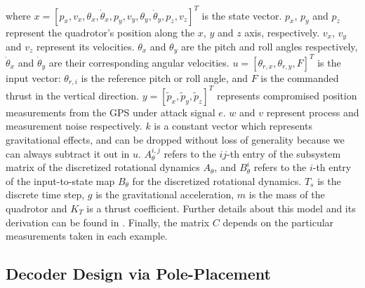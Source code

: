 \documentclass[journal]{IEEEtran}
\begin{document}
\noindent 
where $x = [p_x, v_x, \theta_x, \dot \theta_x, p_y, v_y, \theta_y, \dot\theta_y, p_z, v_z]^T$ is the state vector. $p_x$, $p_y$ and $p_z$ represent the quadrotor's position along the $x$, $y$ and $z$ axis, respectively. $v_x$, $v_y$ and $v_z$ represent its velocities. $\theta_x$ and $\theta_y$ are the pitch and roll angles respectively, $\dot \theta_x$ and $\dot \theta_y$ are their corresponding angular velocities. $u = [\theta_{r,x}, \theta_{r,y}, F]^T$ is the input vector: $\theta_{r,i}$ is the reference pitch or roll angle, and $F$ is the commanded thrust in the vertical direction. $y = [\tilde{p}_x, \tilde{p}_y, \tilde{p}_z]^T$ represents compromised position measurements from the GPS under attack signal $e$. $w$ and $v$ represent process and measurement noise respectively. $k$ is a constant vector which represents gravitational effects, and can be dropped without loss of generality because we can always subtract it out in $u$. $A_\theta^{i,j}$ refers to the $ij$-th entry of the subsystem matrix of the discretized rotational dynamics $A_\theta$, and $B_\theta^i$ refers to the $i$-th entry of the input-to-state map $B_\theta$ for the discretized rotational dynamics. $T_s$ is the discrete time step, $g$ is the gravitational acceleration, $m$ is the mass of the quadrotor and $K_T$ is a thrust coefficient. Further details about this model and its derivation can be found in \cite{Bouffard}. Finally, the matrix $C$ depends on the particular measurements taken in each example.



\subsection{Decoder Design via Pole-Placement}
\end{document}
